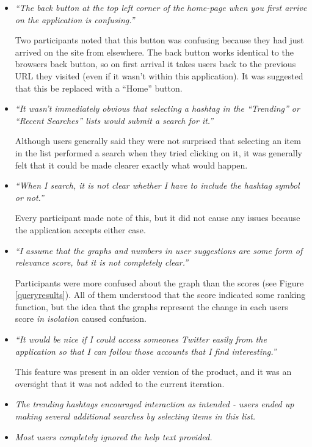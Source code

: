 \documentclass{l4proj}
\begin{document}
\begin{itemize}

\item \textit{``The back button at the top left corner of the home-page when you first arrive on the application is confusing.''}
\par
Two participants noted that this button was confusing because they had just arrived on the site from elsewhere. The back button works identical to the browsers back button, so on first arrival it takes users back to the previous URL they visited (even if it wasn't within this application). It was suggested that this be replaced with a ``Home'' button.

\item \textit{``It wasn't immediately obvious that selecting a hashtag in the ``Trending'' or ``Recent Searches'' lists would submit a search for it.''}
\par
Although users generally said they were not surprised that selecting an item in the list performed a search when they tried clicking on it, it was generally felt that it could be made clearer exactly what would happen.

\item \textit{``When I search, it is not clear whether I have to include the hashtag symbol or not.''}
\par
Every participant made note of this, but it did not cause any issues because the application accepts either case.

\item \textit{``I assume that the graphs and numbers in user suggestions are some form of relevance score, but it is not completely clear.''}
\par
Participants were more confused about the graph than the scores (see Figure \ref{queryresults}). All of them understood that the score indicated some ranking function, but the idea that the graphs represent the change in each users score \textit{in isolation} caused confusion.

\item \textit{``It would be nice if I could access someones Twitter easily from the application so that I can follow those accounts that I find interesting.''}
\par
This feature was present in an older version of the product, and it was an oversight that it was not added to the current iteration.

\item \textit{The trending hashtags encouraged interaction as intended - users ended up making several additional searches by selecting items in this list.}

\item \textit{Most users completely ignored the help text provided.}


\end{itemize}
\end{document}
